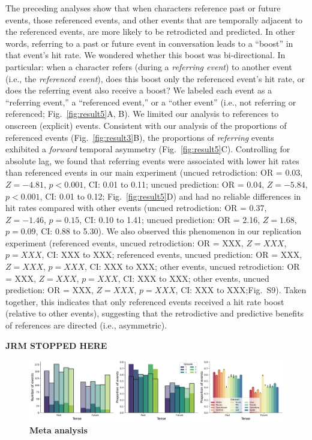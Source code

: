 \documentclass[10pt]{article}
\newcommand{\referringReferenced}{S9}
\begin{document}
The preceding analyses show that when characters reference past or future events, those referenced events, and other events that are temporally adjacent to the referenced events, are more likely to be retrodicted and predicted.  In other words, referring to a past or future event in conversation leads to a ``boost'' in that event's hit rate.  We wondered whether this boost was bi-directional.  In particular: when a character refers (during a \textit{referring event}) to another event (i.e., the \textit{referenced event}), does this boost only the referenced event's hit rate, or does the referring event also receive a boost?  We labeled each event as a ``referring event,'' a ``referenced event,'' or a ``other event'' (i.e., not referring or referenced; Fig.~\ref{fig:result5}A, B).  We limited our analysis to references to onscreen (explicit) events. Consistent with our analysis of the proportions of referenced events (Fig.~\ref{fig:result3}B), the proportions of \textit{referring} events exhibited a \textit{forward} temporal asymmetry (Fig.~\ref{fig:result5}C).  Controlling for absolute lag, we found that referring events were associated with lower hit rates than referenced events in our main experiment (uncued retrodiction: OR = 0.03, $Z = -4.81$, $p < 0.001$, CI: 0.01 to 0.11; uncued prediction: OR = 0.04, $Z = -5.84$, $p < 0.001$, CI: 0.01 to 0.12; Fig.~\ref{fig:result5}D) and had no reliable differences in hit rates compared with other events (uncued retrodiction: OR = 0.37, $Z = -1.46$, $p = 0.15$, CI: 0.10 to 1.41; uncued prediction: OR = 2.16, $Z = 1.68$, $p = 0.09$, CI: 0.88 to 5.30).  We also observed this phenomenon in our replication experiment (referenced events, uncued retrodiction: OR = XXX, $Z = XXX$, $p = XXX$, CI: XXX to XXX; referenced events, uncued prediction: OR = XXX, $Z = XXX$, $p = XXX$, CI: XXX to XXX; other events, uncued retrodiction: OR = XXX, $Z = XXX$, $p = XXX$, CI: XXX to XXX; other events, uncued prediction: OR = XXX, $Z = XXX$, $p = XXX$, CI: XXX to XXX;Fig.~\referringReferenced).  Taken together, this indicates that only referenced events received a hit rate boost (relative to other events), suggesting that the retrodictive and predictive benefits of references are directed (i.e., asymmetric).

\textbf{JRM STOPPED HERE}

\begin{figure}[tp]
  \centering
  \includegraphics[width=\textwidth]{meta-analysis}
  \caption{\textbf{Meta analysis}}
  \label{fig:meta-analysis}
\end{figure}
\end{document}
